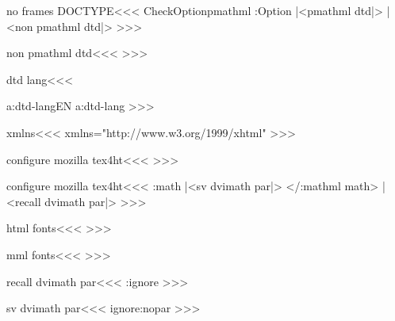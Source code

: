 \<no frames DOCTYPE\><<<
\:CheckOption{pmathml} \if:Option 
    |<pmathml dtd|>
\else
    |<non pmathml dtd|>
\fi
>>>



\<non pmathml dtd\><<<
  {\IgnorePar
    }
>>>


\<dtd lang\><<<
\expandafter
\ifx \csname a:dtd-lang\endcsname\relax EN\else
  \csname a:dtd-lang\endcsname
\fi
>>>





\<xmlns\><<<
xmlns="http://www.w3.org/1999/xhtml"
>>>


\<configure mozilla tex4ht\><<<
     {\IgnorePar{}}
     {}
>>>

%        





\<configure mozilla tex4ht\><<<  
    {\mathmltrue 
     \IgnoreRule{}\a:math
       |<sv dvimath par|>\IgnorePar}
    {\Tg</\a:mathml math>\EndIgnoreRule
     |<recall dvimath par|>\mathmlfalse}
>>>




\<html fonts\><<<
%
>>>

\<mml fonts\><<<
%
>>>



\<recall dvimath par\><<<
\sv:ignore
>>>



\<sv dvimath par\><<<
\edef\sv:ignore{\if:nopar  
    \noexpand\IgnorePar\else \noexpand\ShowPar\fi}%
>>>


